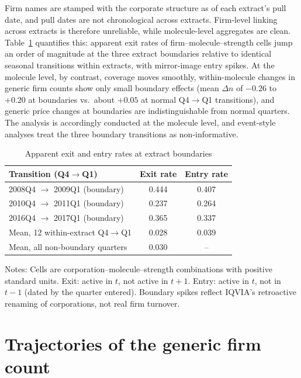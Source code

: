 \documentclass[11pt]{article}
\begin{document}
Firm names are stamped with the corporate structure as of each extract's
pull date, and pull dates are not chronological across extracts. Firm-level linking across extracts is
therefore unreliable, while molecule-level aggregates are clean.
Table~\ref{tab:linking} quantifies this: apparent exit rates of
firm--molecule--strength cells jump an order of magnitude at the three
extract boundaries relative to identical seasonal transitions within
extracts, with mirror-image entry spikes. At the molecule level, by
contrast, coverage moves smoothly, within-molecule changes in generic firm
counts show only small boundary effects (mean $\Delta n$ of $-0.26$ to
$+0.20$ at boundaries vs.\ about $+0.05$ at normal Q4$\to$Q1 transitions), and
generic price changes at boundaries are indistinguishable from normal
quarters. The analysis is accordingly conducted at the molecule level, and
event-style analyses treat the three boundary transitions as
non-informative.

\begin{table}[htbp]
\centering
\caption{Apparent exit and entry rates at extract boundaries}
\label{tab:linking}
\begin{tabular}{lcc}
\toprule
Transition (Q4$\to$Q1) & Exit rate & Entry rate \\
\midrule
2008Q4 $\to$ 2009Q1 (boundary) & 0.444 & 0.407 \\
2010Q4 $\to$ 2011Q1 (boundary) & 0.237 & 0.264 \\
2016Q4 $\to$ 2017Q1 (boundary) & 0.365 & 0.337 \\
\addlinespace
Mean, 12 within-extract Q4$\to$Q1 & 0.028 & 0.039 \\
Mean, all non-boundary quarters   & 0.030 & --    \\
\bottomrule
\end{tabular}
\par\smallskip
\parbox{0.92\textwidth}{\footnotesize Notes: Cells are
corporation--molecule--strength combinations with positive standard units.
Exit: active in $t$, not active in $t+1$. Entry: active in $t$, not in
$t-1$ (dated by the quarter entered). Boundary spikes reflect IQVIA's
retroactive renaming of corporations, not real firm turnover.}
\end{table}


\section{Trajectories of the generic firm count}
\end{document}
